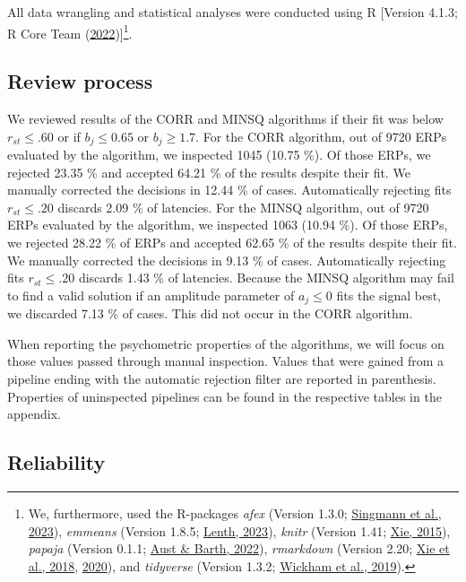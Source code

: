 \documentclass[
  man]{apa7}
\begin{document}
All data wrangling and statistical analyses were conducted using R {[}Version 4.1.3; R Core Team (\protect\hyperlink{ref-R-base}{2022}){]}\footnote{We, furthermore, used the R-packages \emph{afex} (Version 1.3.0; \protect\hyperlink{ref-R-afex}{Singmann et al., 2023}), \emph{emmeans} (Version 1.8.5; \protect\hyperlink{ref-R-emmeans}{Lenth, 2023}), \emph{knitr} (Version 1.41; \protect\hyperlink{ref-R-knitr}{Xie, 2015}), \emph{papaja} (Version 0.1.1; \protect\hyperlink{ref-R-papaja}{Aust \& Barth, 2022}), \emph{rmarkdown} (Version 2.20; \protect\hyperlink{ref-R-rmarkdown_a}{Xie et al., 2018}, \protect\hyperlink{ref-R-rmarkdown_b}{2020}), and \emph{tidyverse} (Version 1.3.2; \protect\hyperlink{ref-R-tidyverse}{Wickham et al., 2019}).}.

\hypertarget{review-process}{%
\subsection{Review process}\label{review-process}}

We reviewed results of the CORR and MINSQ algorithms if their fit was below \(r_{st} \le .60\) or if \(b_j \le 0.65\) or \(b_j \ge 1.7\). For the CORR algorithm, out of 9720 ERPs evaluated by the algorithm, we inspected 1045 (10.75 \%). Of those ERPs, we rejected 23.35 \% and accepted 64.21 \% of the results despite their fit. We manually corrected the decisions in 12.44 \% of cases. Automatically rejecting fits \(r_{st} \le .20\) discards 2.09 \% of latencies. For the MINSQ algorithm, out of 9720 ERPs evaluated by the algorithm, we inspected 1063 (10.94 \%). Of those ERPs, we rejected 28.22 \% of ERPs and accepted 62.65 \% of the results despite their fit. We manually corrected the decisions in 9.13 \% of cases. Automatically rejecting fits \(r_{st} \le .20\) discards 1.43 \% of latencies. Because the MINSQ algorithm may fail to find a valid solution if an amplitude parameter of \(a_j \le 0\) fits the signal best, we discarded 7.13 \% of cases. This did not occur in the CORR algorithm.

When reporting the psychometric properties of the algorithms, we will focus on those values passed through manual inspection. Values that were gained from a pipeline ending with the automatic rejection filter are reported in parenthesis. Properties of uninspected pipelines can be found in the respective tables in the appendix.

\hypertarget{reliability}{%
\subsection{Reliability}\label{reliability}}
\end{document}
